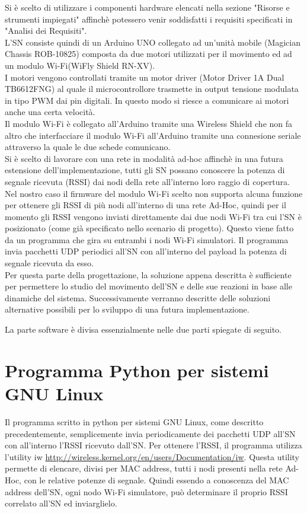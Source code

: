 \documentclass[a4paper,11pt]{report}
\begin{document}
Si è scelto di utilizzare i componenti hardware elencati nella sezione "Risorse e strumenti impiegati" affinchè potessero venir soddisfatti i requisiti specificati in "Analisi dei Requisiti".\\ 
L'SN consiste quindi di un Arduino UNO collegato ad un'unità mobile (Magician Chassis ROB-10825) composta da due motori utilizzati per il movimento ed ad un modulo Wi-Fi(WiFly Shield RN-XV).\\
I motori vengono controllati tramite un motor driver (Motor Driver 1A Dual TB6612FNG) al quale il microcontrollore trasmette in output tensione modulata in tipo PWM dai pin digitali. In questo modo si riesce a comunicare ai motori anche una certa velocità. \\
Il modulo Wi-Fi è collegato all'Arduino tramite una Wireless Shield che non fa altro che interfacciare il modulo Wi-Fi all'Arduino tramite una connesione seriale attraverso la quale le due schede comunicano.\\

Si è scelto di lavorare con una rete in modalità ad-hoc affinchè in una futura estensione dell'implementazione, tutti gli SN possano conoscere la potenza di segnale ricevuta (RSSI) dai nodi della rete all'interno loro raggio di copertura. %
Nel nostro caso il firmware del modulo Wi-Fi scelto non supporta alcuna funzione per ottenere gli RSSI di più nodi all'interno di una rete Ad-Hoc, quindi per il momento gli RSSI vengono inviati direttamente dai due nodi Wi-Fi tra cui l'SN è posizionato (come già specificato nello scenario di progetto). Questo viene fatto da un programma che gira su entrambi i nodi Wi-Fi simulatori. Il programma invia pacchetti UDP periodici all'SN con all'interno del payload la potenza di segnale ricevuta da esso.\\
Per questa parte della progettazione, la soluzione appena descritta è sufficiente per permettere lo studio del movimento dell'SN e delle sue reazioni in base alle dinamiche del sistema. Successivamente verranno descritte delle soluzioni alternative possibili per lo sviluppo di una futura implementazione.          

La parte software è divisa essenzialmente nelle due parti spiegate di seguito.
\section{Programma Python per sistemi GNU Linux}
  Il programma scritto in python per sistemi GNU Linux, come descritto precedentemente, semplicemente invia periodicamente dei pacchetti UDP all'SN con all'interno l'RSSI ricevuto dall'SN. Per ottenere l'RSSI, il programma utilizza l'utility iw \url{http://wireless.kernel.org/en/users/Documentation/iw}. Questa utility permette di elencare, divisi per MAC address, tutti i nodi presenti nella rete Ad-Hoc, con le relative potenze di segnale. Quindi essendo a conoscenza del MAC address dell'SN, ogni nodo Wi-Fi simulatore, può determinare il proprio RSSI correlato all'SN ed inviarglielo. 
\end{document}
